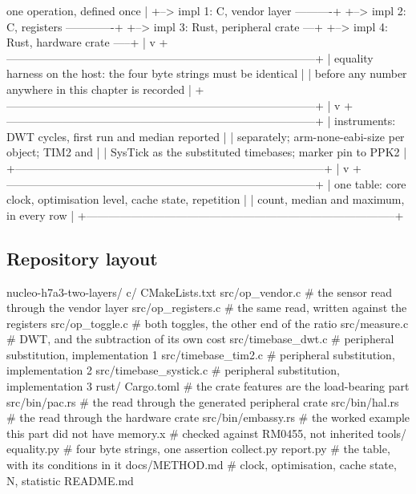 \begin{asciiart}
  one operation, defined once
     |
     +--> impl 1: C, vendor layer ----------+
     +--> impl 2: C, registers -------------+
     +--> impl 3: Rust, peripheral crate ---+
     +--> impl 4: Rust, hardware crate -----+
                                            |
                                            v
  +-----------------------------------------------------------------------------------+
  | equality harness on the host: the four byte strings must be identical             |
  |   before any number anywhere in this chapter is recorded                          |
  +-----------------------------------------------------------------------------------+
                                            |
                                            v
  +-----------------------------------------------------------------------------------+
  | instruments: DWT cycles, first run and median reported                            |
  |   separately; arm-none-eabi-size per object; TIM2 and                             |
  |   SysTick as the substituted timebases; marker pin to PPK2                        |
  +-----------------------------------------------------------------------------------+
                                            |
                                            v
  +-----------------------------------------------------------------------------------+
  | one table: core clock, optimisation level, cache state, repetition                |
  |   count, median and maximum, in every row                                         |
  +-----------------------------------------------------------------------------------+
\end{asciiart}

\subsection*{Repository layout}

\begin{plaincode}
nucleo-h7a3-two-layers/
  c/
    CMakeLists.txt
    src/op_vendor.c          # the sensor read through the vendor layer
    src/op_registers.c       # the same read, written against the registers
    src/op_toggle.c          # both toggles, the other end of the ratio
    src/measure.c            # DWT, and the subtraction of its own cost
    src/timebase_dwt.c       # peripheral substitution, implementation 1
    src/timebase_tim2.c      # peripheral substitution, implementation 2
    src/timebase_systick.c   # peripheral substitution, implementation 3
  rust/
    Cargo.toml               # the crate features are the load-bearing part
    src/bin/pac.rs           # the read through the generated peripheral crate
    src/bin/hal.rs           # the read through the hardware crate
    src/bin/embassy.rs       # the worked example this part did not have
    memory.x                 # checked against RM0455, not inherited
  tools/
    equality.py              # four byte strings, one assertion
    collect.py  report.py    # the table, with its conditions in it
  docs/METHOD.md             # clock, optimisation, cache state, N, statistic
  README.md
\end{plaincode}

